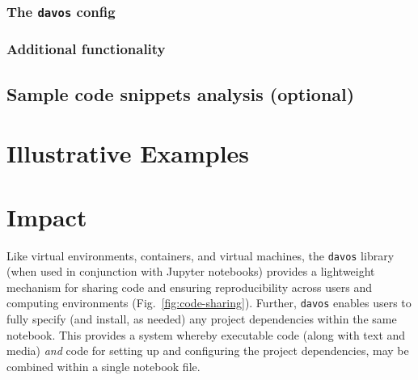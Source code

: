 \documentclass[preprint,12pt, a4paper]{elsarticle}
\begin{document}
\subsubsection{The \texttt{davos} config}

\subsubsection{Additional functionality}



\subsection{Sample code snippets analysis (optional)}


\section{Illustrative Examples}



\section{Impact}

Like virtual environments, containers, and virtual machines, the
\texttt{davos} library (when used in conjunction with Jupyter
notebooks) provides a lightweight mechanism for sharing code and
ensuring reproducibility across users and computing environments
(Fig.~\ref{fig:code-sharing}).  Further, \texttt{davos} enables users
to fully specify (and install, as needed) any project dependencies
within the same notebook.  This provides a system whereby executable
code (along with text and media) \textit{and} code for setting up and
configuring the project dependencies, may be combined within a single
notebook file.
\end{document}
